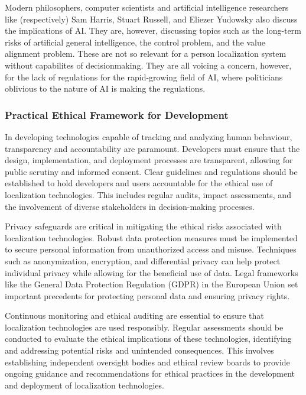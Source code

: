 Modern philosophers, computer scientists and artificial intelligence researchers like (respectively) Sam Harris, Stuart Russell, and Eliezer Yudowsky also discuss the implications of AI. They are, however, discussing topics such as the long-term risks of artificial general intelligence, the control problem, and the value alignment problem. These are not so relevant for a person localization system without capabilites of decisionmaking. They are all voicing a concern, however, for the lack of regulations for the rapid-growing field of AI, where politicians oblivious to the nature of AI is making the regulations. 

\subsubsection{Practical Ethical Framework for Development}
In developing technologies capable of tracking and analyzing human behaviour, transparency and accountability are paramount. Developers must ensure that the design, implementation, and deployment processes are transparent, allowing for public scrutiny and informed consent. Clear guidelines and regulations should be established to hold developers and users accountable for the ethical use of localization technologies. This includes regular audits, impact assessments, and the involvement of diverse stakeholders in decision-making processes.

Privacy safeguards are critical in mitigating the ethical risks associated with localization technologies. Robust data protection measures must be implemented to secure personal information from unauthorized access and misuse. Techniques such as anonymization, encryption, and differential privacy can help protect individual privacy while allowing for the beneficial use of data. Legal frameworks like the General Data Protection Regulation (GDPR) in the European Union set important precedents for protecting personal data and ensuring privacy rights.

Continuous monitoring and ethical auditing are essential to ensure that localization technologies are used responsibly. Regular assessments should be conducted to evaluate the ethical implications of these technologies, identifying and addressing potential risks and unintended consequences. This involves establishing independent oversight bodies and ethical review boards to provide ongoing guidance and recommendations for ethical practices in the development and deployment of localization technologies.

